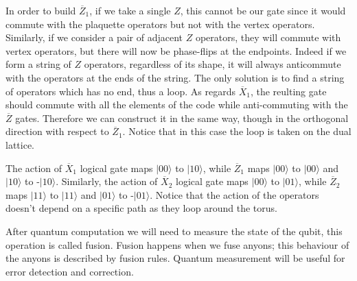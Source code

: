 \documentclass[12pt]{report}
\begin{document}
\begin{minipage}{1 \textwidth}
		In order to build $\overline{Z}_1$, if we take a single $Z$, this cannot be our gate since it would commute with the plaquette operators but not with the vertex operators. 
		Similarly, if we consider a pair of adjacent $Z$ operators, they will commute with vertex operators, but there will now be phase-flips at the endpoints. Indeed if we form a string of $Z$ operators, regardless of its shape, it will always anticommute with the operators at the ends of the string. The only solution is to find a string of operators which has no end, thus a loop.\newline
		As regards $\overline{X}_1$, the reulting gate should commute with all the elements of the code while anti-commuting with the $\overline{Z}$ gates. Therefore we can construct it in the same way, though in the orthogonal direction with respect to $\overline{Z}_1$. Notice that in this case the loop is taken on the dual lattice. \newline
		
		  
		The action of $\overline{X}_1$ logical gate maps $|00\rangle$ to $|10\rangle$, while $\overline{Z}_1$ maps $|00\rangle$ to $|00\rangle$ and $|10\rangle$ to -$|10\rangle$. Similarly, the action of $\overline{X}_2$ logical gate maps $|00\rangle$ to $|01\rangle$, while $\overline{Z}_2$ maps $|11\rangle$ to $|11\rangle$ and $|01\rangle$ to -$|01\rangle$. Notice that the action of the operators doesn't depend on a specific path as they loop around the torus.\newline
		
		After quantum computation we will need to measure the state of the qubit, this operation is called fusion. Fusion happens when we fuse anyons; this behaviour of the anyons is described by fusion rules.
		Quantum measurement will be useful for error detection and correction. \newline 

		
	\end{minipage}
	
\end{document}
